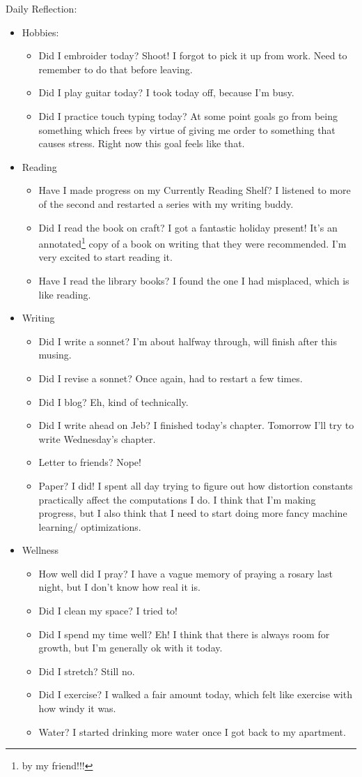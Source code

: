 \documentclass[12pt]{article}[titlepage]
\renewcommand{\,}{\textsuperscript{,}}
\begin{document}
Daily Reflection:
\begin{itemize}
\item Hobbies:
\begin{itemize}
\item Did I embroider today? Shoot! I forgot to pick it up from work. Need to remember to do that before leaving.
\item Did I play guitar today? I took today off, because I'm busy.
\item Did I practice touch typing today? At some point goals go from being something which frees by virtue of giving me order to something that causes stress. Right now this goal feels like that.
\end{itemize}
\item Reading
\begin{itemize}
\item Have I made progress on my Currently Reading Shelf? I listened to more of the second and restarted a series with my writing buddy.
\item Did I read the book on craft? I got a fantastic holiday present! It's an annotated\footnote{by my friend!!!} copy of a book on writing that they were recommended.
I'm very excited to start reading it.
\item Have I read the library books? I found the one I had misplaced, which is like reading.
\end{itemize}
\item Writing
\begin{itemize}
\item Did I write a sonnet? I'm about halfway through, will finish after this musing.
\item Did I revise a sonnet? Once again, had to restart a few times.
\item Did I blog? Eh, kind of technically.
\item Did I write ahead on Jeb? I finished today's chapter. Tomorrow I'll try to write Wednesday's chapter.
\item Letter to friends? Nope!
\item Paper? I did! I spent all day trying to figure out how distortion constants practically affect the computations I do. I think that I'm making progress, but I also think that I need to start doing more fancy machine learning/ optimizations.
\end{itemize}
\item Wellness
\begin{itemize}
\item How well did I pray? I have a vague memory of praying a rosary last night, but I don't know how real it is.
\item Did I clean my space? I tried to!
\item Did I spend my time well? Eh! I think that there is always room for growth, but I'm generally ok with it today.
\item Did I stretch? Still no.
\item Did I exercise? I walked a fair amount today, which felt like exercise with how windy it was.
\item Water? I started drinking more water once I got back to my apartment.
\end{itemize}
\end{itemize}
\end{document}
